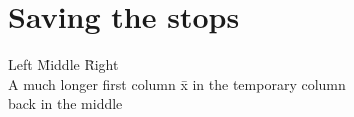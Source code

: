 \section{Saving the stops}

\begin{tabbing}
Left  \= Middle  \= Right \\
\pushtabs
A much longer first column  \= x \kill
\> in the temporary column \\
\poptabs
\> back in the middle
\end{tabbing}

